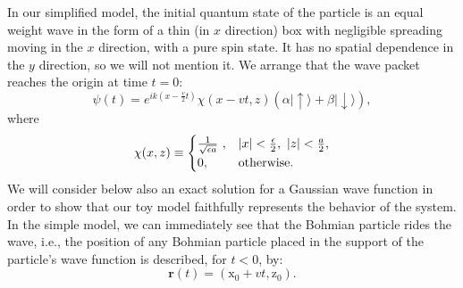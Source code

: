 \documentclass[preprint,tightenlines]{elsarticle}
\begin{document}
In our simplified model, the initial quantum state of the particle
is an equal weight wave in the form of a thin (in $x$ direction)
box with negligible spreading moving in the $x$ direction, with a
pure spin state. It has no spatial dependence in the $y$ direction,
so we will not mention it. We arrange that the wave packet reaches
the origin at time $t=0$:
\begin{equation}
\psi(t)=e^{ik(x-\frac{v}{2}t)}\chi(x-vt,z)(\alpha|\uparrow\rangle+\beta|\downarrow\rangle),\label{psiin}
\end{equation}
 where
 \begin{equation}
\chi(x,z)\equiv\begin{cases}
\frac{1}{{\sqrt{\epsilon a}}}~, & |x|<\frac{\epsilon}{2},~|z|<\frac{a}{2},\\
0, & {\rm otherwise}.\end{cases}\label{chi}
\end{equation}
 We will consider below also an exact solution for a Gaussian wave
function in order to show that our toy model faithfully represents
the behavior of the system. In the simple model, we can immediately
see that the Bohmian particle rides the wave, i.e., the position of
any Bohmian particle placed in the support of the particle's wave
function is described, for $t<0$, by:
\begin{equation}
\mathbf{r}(t)=(\mathrm{x}_{0}+vt,\mathrm{z}_{0}).
\end{equation}
\end{document}
